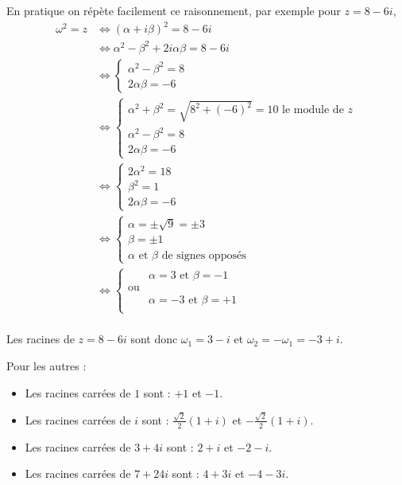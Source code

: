 {{En pratique on r\'ep\`ete facilement ce raisonnement, par exemple
pour  $z = 8-6i$,
\begin{align*}
\omega^2 = z
&\Leftrightarrow (\alpha +i \beta)^2 = 8-6i\\
&\Leftrightarrow \alpha^2-\beta^2+2i\alpha\beta = 8-6i\\
&\Leftrightarrow
  \begin{cases}
     \alpha^2-\beta^2 = 8\\
     2\alpha\beta = -6
  \end{cases} \\
&\Leftrightarrow
  \begin{cases}
     \alpha^2 + \beta^2 = \sqrt{8^2+(-6)^2} = 10 \text{ le module de $z$} \\
     \alpha^2-\beta^2 = 8 \\
     2\alpha\beta = -6
  \end{cases}\\
&\Leftrightarrow
  \begin{cases}
     2\alpha^2  =18 \\
     \beta^2 = 1 \\
     2\alpha\beta = -6
  \end{cases}\\
&\Leftrightarrow
  \begin{cases}
     \alpha  =\pm \sqrt{9} = \pm 3 \\
     \beta = \pm 1 \\
     \alpha \text{ et } \beta \text{ de signes oppos\'es}
  \end{cases} \\
&\Leftrightarrow
  \begin{cases}
     \ \ & \alpha  = 3 \text{ et } \beta = - 1\\
     \text{ou}&\\
    \ \ &\alpha  = -3 \text{ et } \beta = +1 \\
\end{cases} \\
\end{align*}

Les racines de $ z = 8-6i$ sont donc $\omega_1 = 3-i$ et $\omega_2 = -\omega_1 =
-3+i$.

Pour les autres : 
\begin{itemize}
 \item Les racines carrées de $1$ sont : $+1$ et $-1$.
 \item  Les racines carrées de $i$ sont : $\frac{\sqrt 2}{2}(1+i)$ et $-\frac{\sqrt 2}{2}(1+i)$.
 \item  Les racines carrées de $3+4i$ sont : $2+i$ et $-2-i$. 
 \item  Les racines carrées de $7+24i$ sont : $4+3i$ et $-4-3i$. 
\end{itemize}
}
}
